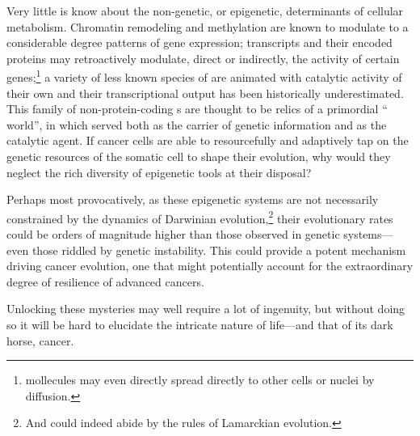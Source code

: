 Very little is know about the non-genetic, or epigenetic, determinants of
cellular metabolism.  Chromatin remodeling and  methylation are
known to modulate to a considerable degree patterns of gene expression;
 transcripts and their encoded proteins may retroactively
modulate, direct or indirectly, the activity of certain
genes;\footnote{ mollecules may even directly spread directly to
  other cells or nuclei by diffusion.} a variety of less known species of
 are animated with catalytic activity of their own and their
transcriptional output has been historically
underestimated.\cite{huttenhofer_principles_2006,ptashne_use_2007}  This family
of non-protein-coding s are thought to be relics of a primordial
`` world'', in which  served both as the carrier
of genetic information and as the catalytic agent.  If cancer cells are able to
resourcefully and adaptively tap on the genetic resources of the somatic cell to
shape their evolution, why would they neglect the rich diversity of epigenetic
tools at their disposal?

Perhaps most provocatively, as these epigenetic systems are not necessarily
constrained by the dynamics of Darwinian evolution,\footnote{And could indeed
  abide by the rules of Lamarckian evolution.} their evolutionary rates could be
orders of magnitude higher than those observed in genetic systems---even those
riddled by genetic instability.  This could provide a potent mechanism driving
cancer evolution, one that might potentially account for the extraordinary
degree of resilience of advanced cancers.


\medskip

Unlocking these mysteries may well require a lot of ingenuity, but without doing
so it will be hard to elucidate the intricate nature of life---and that of
its dark horse, cancer.




